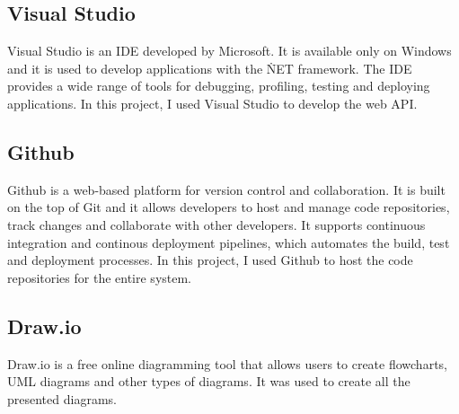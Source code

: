 \subsection{Visual Studio}
Visual Studio is an IDE developed by Microsoft. It is available only on Windows and it is used to develop applications with the \.NET framework.
The IDE provides a wide range of tools for debugging, profiling, testing and deploying applications. 
In this project, I used Visual Studio to develop the web API\cite{github_docs}.

\subsection{Github}
Github is a web-based platform for version control and collaboration. It is built on the top of Git and it allows developers to host and manage 
code repositories, track changes and collaborate with other developers. It supports continuous integration and continous deployment pipelines,
which automates the build, test and deployment processes\cite{github_docs}. In this project, I used Github to host the code repositories for the entire system.

\subsection{Draw.io}
Draw.io is a free online diagramming tool that allows users to create flowcharts, UML diagrams and other types of diagrams.
It was used to create all the presented diagrams.